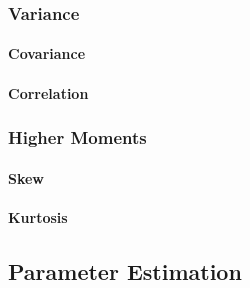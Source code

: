 

\subsubsection{Variance}


%

\paragraph{Covariance}

\paragraph{Correlation}


\subsubsection{Higher Moments}

\paragraph{Skew}

\paragraph{Kurtosis}







\subsection{Parameter Estimation}



